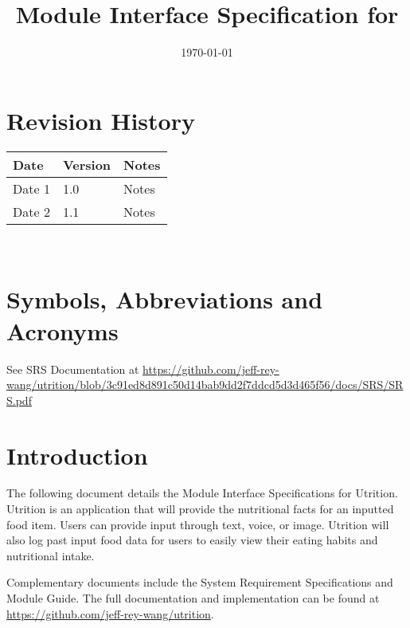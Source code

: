 \documentclass[12pt, titlepage]{article}
\begin{document}
\title{Module Interface Specification for \progname{}}

\author{\authname}

\date{\today}

\maketitle


\section{Revision History}

\begin{tabularx}{\textwidth}{p{3cm}p{2cm}X}
\toprule {\bf Date} & {\bf Version} & {\bf Notes}\\
\midrule
Date 1 & 1.0 & Notes\\
Date 2 & 1.1 & Notes\\
\bottomrule
\end{tabularx}

~\newpage

\section{Symbols, Abbreviations and Acronyms}

See SRS Documentation at \url{https://github.com/jeff-rey-wang/utrition/blob/3c91ed8d891c50d14bab9dd2f7ddcd5d3d465f56/docs/SRS/SRS.pdf}


\newpage

\tableofcontents

\newpage


\section{Introduction}

The following document details the Module Interface Specifications for Utrition. Utrition is an application that will provide the nutritional facts for an inputted food item. Users can provide input through text, voice, or image. Utrition will also log past input food data for users to easily view their eating habits and nutritional intake.

Complementary documents include the System Requirement Specifications
and Module Guide.  The full documentation and implementation can be
found at \url{https://github.com/jeff-rey-wang/utrition}.
\end{document}
